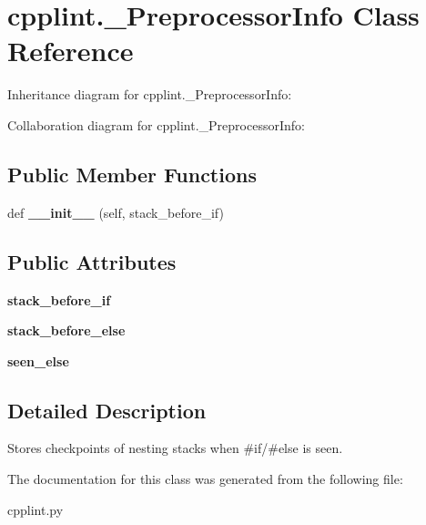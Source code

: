 \hypertarget{classcpplint_1_1__PreprocessorInfo}{}\section{cpplint.\+\_\+\+Preprocessor\+Info Class Reference}
\label{classcpplint_1_1__PreprocessorInfo}


Inheritance diagram for cpplint.\+\_\+\+Preprocessor\+Info\+:


Collaboration diagram for cpplint.\+\_\+\+Preprocessor\+Info\+:
\subsection*{Public Member Functions}
\begin{DoxyCompactItemize}
\item 
\mbox{\label{classcpplint_1_1__PreprocessorInfo_a1394d17434a22d32b0ea9d6424e5c47b}} 
def {\bfseries \+\_\+\+\_\+init\+\_\+\+\_\+} (self, stack\+\_\+before\+\_\+if)
\end{DoxyCompactItemize}
\subsection*{Public Attributes}
\begin{DoxyCompactItemize}
\item 
\mbox{\label{classcpplint_1_1__PreprocessorInfo_a0681b2adca3171a495fc1eca43d245c0}} 
{\bfseries stack\+\_\+before\+\_\+if}
\item 
\mbox{\label{classcpplint_1_1__PreprocessorInfo_a34a80f1f97808614b7062ba1e5bbf2b9}} 
{\bfseries stack\+\_\+before\+\_\+else}
\item 
\mbox{\label{classcpplint_1_1__PreprocessorInfo_a7587e84a1e6db34c3c94317f5a5931cc}} 
{\bfseries seen\+\_\+else}
\end{DoxyCompactItemize}


\subsection{Detailed Description}
\begin{DoxyVerb}Stores checkpoints of nesting stacks when #if/#else is seen.\end{DoxyVerb}
 

The documentation for this class was generated from the following file\+:\begin{DoxyCompactItemize}
\item 
cpplint.\+py\end{DoxyCompactItemize}
